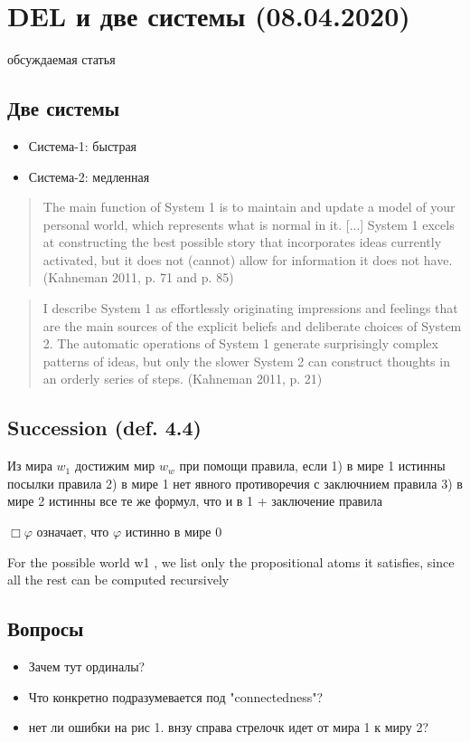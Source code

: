 \section{DEL и две системы (08.04.2020)}
обсуждаемая статья \autocite{Solaki2019TheThinking}

\subsection{Две системы}

\begin{itemize}
	\item Система-1: быстрая
	\item Система-2: медленная
\end{itemize}

\begin{quote}
The main function of System 1 is to maintain and update a model of your personal world, which represents what is normal in it. [...] System 1 excels at constructing the best possible story that incorporates ideas currently activated, but it does not (cannot) allow for information it does not have. (Kahneman 2011, p. 71 and p. 85)	
\end{quote}

\begin{quote}
I describe System 1 as effortlessly originating impressions and feelings that are the main sources of the explicit beliefs and deliberate choices of System 2. The automatic operations of System 1 generate surprisingly complex patterns of ideas, but only the slower System 2 can construct thoughts in an orderly series of steps. (Kahneman 2011, p. 21)	
\end{quote}

\subsection{Succession (def. 4.4)}

Из мира $w_1$ достижим мир $w_w$ при помощи правила, если 1) в мире 1 истинны посылки правила 2) в мире 1 нет явного противоречия с заключнием правила 3) в мире 2 истинны все те же формул, что и в 1 + заключение правила



$\Box \varphi$ означает, что $\varphi$ истинно в мире 0

For the possible world w1 , we list only the propositional atoms it satisfies, since all the rest can be computed recursively

\subsection{Вопросы}

\begin{itemize}
    \item Зачем тут ординалы?
    \item Что конкретно подразумевается под "connectedness"?
    \item нет ли ошибки на рис 1. внзу справа стрелочк идет от мира 1 к миру 2?
\end{itemize}


